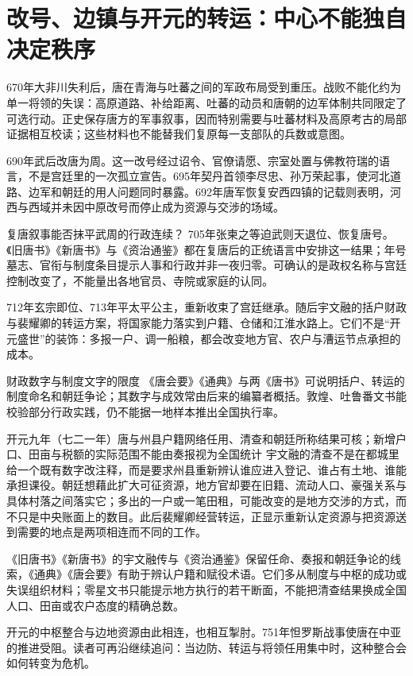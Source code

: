 \section{改号、边镇与开元的转运：中心不能独自决定秩序}
\label{sec:wu-zhou-curated-chronicle}

670年大非川失利后，唐在青海与吐蕃之间的军政布局受到重压。战败不能化约为单一将领的失误：高原道路、补给距离、吐蕃的动员和唐朝的边军体制共同限定了可选行动。正史保存唐方的军事叙事，因而特别需要与吐蕃材料及高原考古的局部证据相互校读；这些材料也不能替我们复原每一支部队的兵数或意图。

690年武后改唐为周。这一改号经过诏令、官僚请愿、宗室处置与佛教符瑞的语言，不是宫廷里的一次孤立宣告。695年契丹首领李尽忠、孙万荣起事，使河北道路、边军和朝廷的用人问题同时暴露。692年唐军恢复安西四镇的记载则表明，河西与西域并未因中原改号而停止成为资源与交涉的场域。

\begin{debate}{复唐叙事能否抹平武周的行政连续？}
705年张柬之等迫武则天退位、恢复唐号。《旧唐书》《新唐书》与《资治通鉴》都在复唐后的正统语言中安排这一结果；年号墓志、官衔与制度条目提示人事和行政并非一夜归零。可确认的是政权名称与宫廷控制改变了，不能量出各地官员、寺院或家庭的认同。
\end{debate}

712年玄宗即位、713年平太平公主，重新收束了宫廷继承。随后宇文融的括户财政与裴耀卿的转运方案，将国家能力落实到户籍、仓储和江淮水路上。它们不是“开元盛世”的装饰：多报一户、调一船粮，都会改变地方官、农户与漕运节点承担的成本。

\begin{sourcenote}{财政数字与制度文字的限度}
《唐会要》《通典》与两《唐书》可说明括户、转运的制度命名和朝廷争论；其数字与成效常由后来的编纂者概括。敦煌、吐鲁番文书能校验部分行政实践，仍不能据一地样本推出全国执行率。
\end{sourcenote}

\begin{event}{}{开元九年（七二一年）}{唐与州县户籍网络}{任用、清查和朝廷所称结果可核；新增户口、田亩与税额的实际范围不能由奏报视为全国统计}
宇文融的清查不是在都城里给一个既有数字改注释，而是要求州县重新辨认谁应进入登记、谁占有土地、谁能承担课役。朝廷想藉此扩大可征资源，地方官却要在旧籍、流动人口、豪强关系与具体村落之间落实它；多出的一户或一笔田租，可能改变的是地方交涉的方式，而不只是中央账面上的数目。此后裴耀卿经营转运，正显示重新认定资源与把资源送到需要的地点是两项相连而不同的工作。

《旧唐书》《新唐书》的宇文融传与《资治通鉴》保留任命、奏报和朝廷争论的线索，《通典》《唐会要》有助于辨认户籍和赋役术语。它们多从制度与中枢的成功或失误组织材料；零星文书只能提示地方执行的若干断面，不能把清查结果换成全国人口、田亩或农户态度的精确总数。
\end{event}

开元的中枢整合与边地资源由此相连，也相互掣肘。751年怛罗斯战事使唐在中亚的推进受阻。读者可再沿继续追问：当边防、转运与将领任用集中时，这种整合会如何转变为危机。
